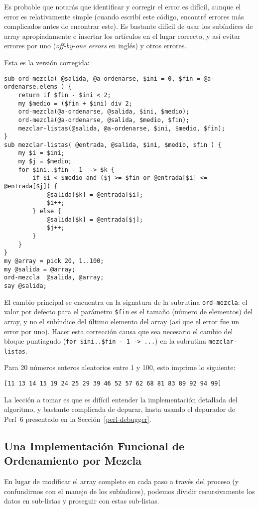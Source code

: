 Es probable que notarás que identificar y corregir el error es difícil,
aunque el error es relativamente simple (cuando escribí este código, 
encontré errores más complicados antes de encontrar este). Es bastante
difícil de usar los subíndices de array apropiadamente e insertar
los artículos en el lugar correcto, y así evitar errores por uno 
(\emph{off-by-one errors} en inglés) y otros errores.

Esta es la versión corregida:

\begin{verbatim}
sub ord-mezcla( @salida, @a-ordenarse, $ini = 0, $fin = @a-ordenarse.elems ) {
    return if $fin - $ini < 2;
    my $medio = ($fin + $ini) div 2;
    ord-mezcla(@a-ordenarse, @salida, $ini, $medio);
    ord-mezcla(@a-ordenarse, @salida, $medio, $fin);
    mezclar-listas(@salida, @a-ordenarse, $ini, $medio, $fin);
}
sub mezclar-listas( @entrada, @salida, $ini, $medio, $fin ) {
    my $i = $ini;
    my $j = $medio;
    for $ini..$fin - 1  -> $k {
        if $i < $medio and ($j >= $fin or @entrada[$i] <= @entrada[$j]) {
            @salida[$k] = @entrada[$i];
            $i++;
        } else {
            @salida[$k] = @entrada[$j];
            $j++;
        } 
    }
}
my @array = pick 20, 1..100;
my @salida = @array;
ord-mezcla  @salida, @array;
say @salida;
\end{verbatim}

El cambio principal se encuentra en la signatura de la subrutina
\verb|ord-mezcla|: el valor por defecto para el parámetro \verb|$fin|
es el tamaño (número de elementos) del array, y no el subíndice del
último elemento del array (así que el error fue un error por uno).
Hacer esta corrección causa que sea necesario el cambio del
bloque puntiagudo (\verb'for $ini..$fin - 1 -> ...') en la
subrutina \verb|mezclar-listas|.

Para 20 números enteros aleatorios entre 1 y 100, esto imprime
lo siguiente:

\begin{verbatim}
[11 13 14 15 19 24 25 29 39 46 52 57 62 68 81 83 89 92 94 99]
\end{verbatim}


La lección a tomar es que es difícil entender la implementación detallada del
algoritmo, y bastante complicada de depurar, hasta usando el depurador
de Perl~6 presentado en la Sección~\ref{perl-debugger}.

\subsection{Una Implementación Funcional de Ordenamiento por Mezcla}
En lugar de modificar el array completo en cada paso a través del proceso
(y confundirnos con el manejo de los subíndices), podemos dividir recursivamente
los datos en sub-listas y proseguir con estas sub-listas.

